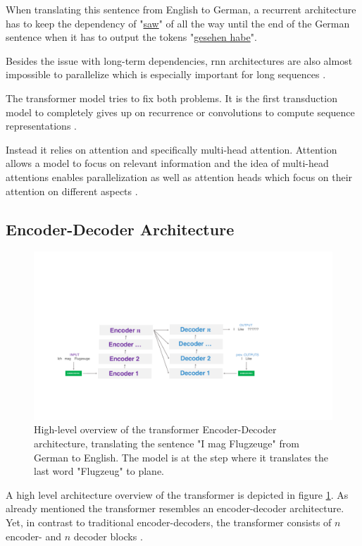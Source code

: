 When translating this sentence from English to German, a recurrent architecture has to keep the dependency of "\underline{saw}" of all the way until the end of the German sentence when it has to output the tokens "\underline{gesehen habe}".
\medskip

Besides the issue with long-term dependencies, \gls{rnn} architectures are also almost impossible to parallelize which is especially important for long sequences \cite{Vaswani2017d}.
\medskip

The transformer model tries to fix both problems. It is the first transduction model to completely gives up on recurrence or convolutions to compute sequence representations \cite{Vaswani2017d}. 

Instead it relies on attention and specifically multi-head attention. Attention allows a model to focus on relevant information and the idea of multi-head attentions enables parallelization as well as attention heads which focus on their attention on different aspects \cite{Vaswani2017d}.

\subsection{Encoder-Decoder Architecture}

\begin{figure}[htp]
	\centering
	\includegraphics[width=\textwidth]{figures/03_theory/03_transformer_Architecture_HighLevel}
	\caption{High-level overview of the transformer Encoder-Decoder architecture, translating the sentence "I mag Flugzeuge" from German to English. The model is at the step where it translates the last word "Flugzeug" to plane.}
	\label{fig:03_transformer_HighlevelOverview}
\end{figure}

A high level architecture overview of the transformer is depicted in figure \ref{fig:03_transformer_HighlevelOverview}. As already mentioned the transformer resembles an encoder-decoder architecture. Yet, in contrast to traditional encoder-decoders, the transformer consists of $n$ encoder- and $n$ decoder blocks \cite{Vaswani2017d}. 
\medskip

